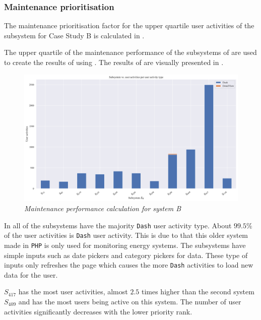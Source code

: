 \subsubsection{Maintenance prioritisation}
The maintenance prioritisation factor for the upper quartile user activities of the subsystem for Case Study B is calculated in .



The upper quartile of the maintenance performance of the subsystems of  are used to create the results of  using . The results of  are visually presented in .

\begin{figure}[!htb]
	\centering %
	\includegraphics[width=0.95\linewidth]{img/ch3/analysis/case_B_subsystems_1.pdf}
	\caption[Maintenance performance calculation for system B]
	{\textit{Maintenance performance calculation for system B}}\label{fig:ch3_systemsBBar}
\end{figure} 

In  all of the subsystems have the majority \texttt{Dash} user activity type. About $99.5\%$ of the user activities is \texttt{Dash} user activity. This is due to that this older system made in \texttt{PHP} is only used for monitoring energy systems. The subsystems have simple inputs such as date pickers and category pickers for data. These type of inputs only refreshes the page which causes the more \texttt{Dash} activities to load new data for the user.\par $S_{417}$ has the most user activities, almost $2.5$ times higher than the second system $S_{409}$ and has the most users being active on this system. The number of user activities significantly decreases with the lower priority rank.


